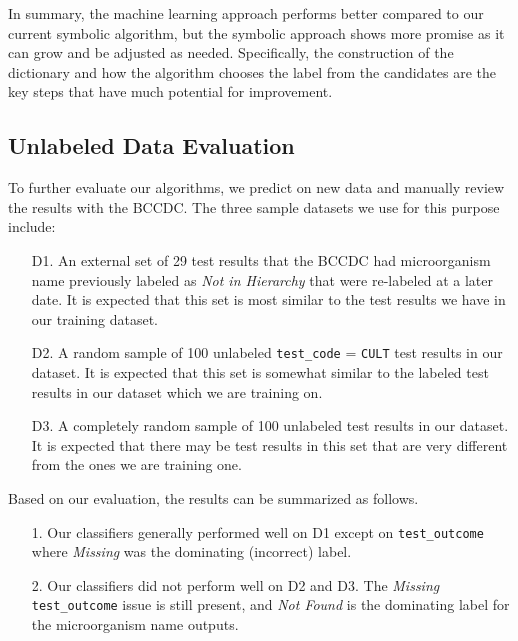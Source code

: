 \documentclass[11pt]{article}
\begin{document}
In summary, the machine learning approach performs better compared to our current symbolic algorithm, but the symbolic approach shows more promise as it can grow and be adjusted as needed. Specifically, the construction of the dictionary and how the algorithm chooses the label from the candidates are the key steps that have much potential for improvement.


\subsection{Unlabeled Data Evaluation} \label{unlabeled data evaluation}

To further evaluate our algorithms, we predict on new data and manually review the results with the BCCDC. The three sample datasets we use for this purpose include:

\begin{enumerate}

\item[D1.] An external set of 29 test results that the BCCDC had microorganism name previously labeled as \textit{Not in Hierarchy} that were re-labeled at a later date. It is expected that this set is most similar to the test results we have in our training dataset.

\item[D2.] A random sample of 100 unlabeled \verb|test_code| = \verb|CULT| test results in our dataset. It is expected that this set is somewhat similar to the labeled test results in our dataset which we are training on.

\item[D3.] A completely random sample of 100 unlabeled test results in our dataset. It is expected that there may be test results in this set that are very different from the ones we are training one.

\end{enumerate}

Based on our evaluation, the results can be summarized as follows.

\begin{enumerate}

\item[1.]
Our classifiers generally performed well on D1 except on \verb|test_outcome| where \textit{Missing} was the dominating (incorrect) label.

\item[2.]
Our classifiers did not perform well on D2 and D3. The \textit{Missing} \verb|test_outcome| issue is still present, and \textit{Not Found} is the dominating label for the microorganism name outputs.

\end{enumerate}
\end{document}
